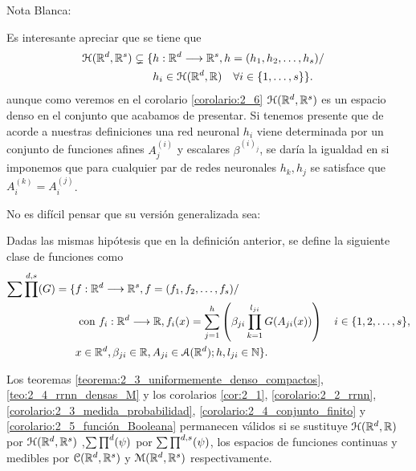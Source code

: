 \iconoAclaraciones \textcolor{dark_green}{ Nota Blanca: }


Es interesante apreciar que se tiene que 
    \begin{equation} \label{eq:diferencia_conjuntos_multicapa}
        \begin{split}
        \mathcal{H}(\mathbb{R}^d,\mathbb{R}^s) \subsetneq
        \{ 
            & h: \mathbb{R} ^d \longrightarrow \mathbb{R}^s, h= (h_1, h_2, \ldots, h_s)  / \quad 
            \\ &
            h_i \in \mathcal{H}(\mathbb{R}^d,\mathbb{R}) \quad \forall i \in \{1, \ldots, s\}
        \}.
        \end{split}
    \end{equation}
    aunque como veremos en el corolario \ref{corolario:2_6} $\mathcal{H}(\mathbb{R}^d,\mathbb{R}^s)$ es un espacio denso en el conjunto que acabamos de presentar. 
    Si tenemos presente que de acorde a nuestras definiciones una red neuronal $h_i$ viene determinada por un conjunto de funciones afines $A^{(i)}_j$  y escalares $\beta^{(i)_j}$, se daría la igualdad en  si imponemos que para cualquier par de redes neuronales $h_k, h_j$ se satisface que $A^{(k)}_i = A^{(j)}_i$. 


No es difícil pensar que su versión generalizada sea: 

\begin{definicion} 
    Dadas las mismas hipótesis que en la definición anterior, se define la siguiente clase de funciones como 
    \begin{equation}
        \begin{split}
            \sum \prod^{d, s}(G) 
            = 
        \{ 
            & f: \mathbb{R} ^d \longrightarrow \mathbb{R}^s, f= (f_1, f_2, \ldots , f_s)  / \quad 
            \\ &
            \text{ con } f_i : \mathbb{R} ^d\longrightarrow \mathbb{R}, 
            f_i(x)=\sum_{j = 1} ^h 
            \left(
            \beta_{j i} \prod_{k=1}^{l_{j i}} G(A_{j i}(x))
            \right)
             \quad i \in \{1,2,\ldots, s\}, \\
            & x \in \mathbb{R} ^d, \beta_{j i} \in \mathbb{R}, A_{j i}\in \mathcal{A}(\mathbb{R}^d); h,l_{j i} \in \mathbb{N} 
        \}.
        \end{split}
    \end{equation}
\end{definicion}


\begin{corolario}\label{corolario:2_6}
    Los teoremas 
    \ref{teorema:2_3_uniformemente_denso_compactos},
    \ref{teo:2_4_rrnn_densas_M} 
    y los corolarios
    \ref{cor:2_1}, 
    \ref{corolario:2_2_rrnn},
    \ref{corolario:2_3_medida_probabilidad},
    \ref{corolario:2_4_conjunto_finito}
    y 
    \ref{corolario:2_5_función_Booleana}
    permanecen válidos si se sustituye $\mathcal{H}(\mathbb{R}^d,\mathbb{R})$ por $\mathcal{H}(\mathbb{R}^d,\mathbb{R}^s)$
    ,$\sum \prod^d (\psi)$ por $\sum \prod^{d,s} (\psi)$, 
    los espacios de funciones continuas y medibles por $\mathcal{C}(\mathbb{R}^d ,\mathbb{R}^s)$ y $\mathcal{M}(\mathbb{R}^d , \mathbb{R}^s)$ respectivamente.
\end{corolario}

